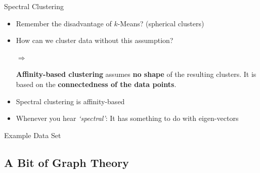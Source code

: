 \begin{frame}{Spectral Clustering}{}
	\begin{itemize}
		\item Remember the disadvantage of $k$-Means? (spherical clusters)
		\item How can we cluster data without this assumption?
		\item[$\bm{\Rightarrow}$] 
		
		\vspace*{3mm}
		\begin{boxBlueNoFrame}
			\textbf{Affinity-based clustering} assumes \textbf{no shape} of the resulting clusters.
			It is based on the \textbf{connectedness of the data points}.
		\end{boxBlueNoFrame}

		\item Spectral clustering is affinity-based
		\item Whenever you hear \textit{`spectral'}: It has something to do with eigen-vectors
	\end{itemize}
\end{frame}


\begin{frame}{Example Data Set}{}
	
\end{frame}


\subsection{A Bit of Graph Theory}

